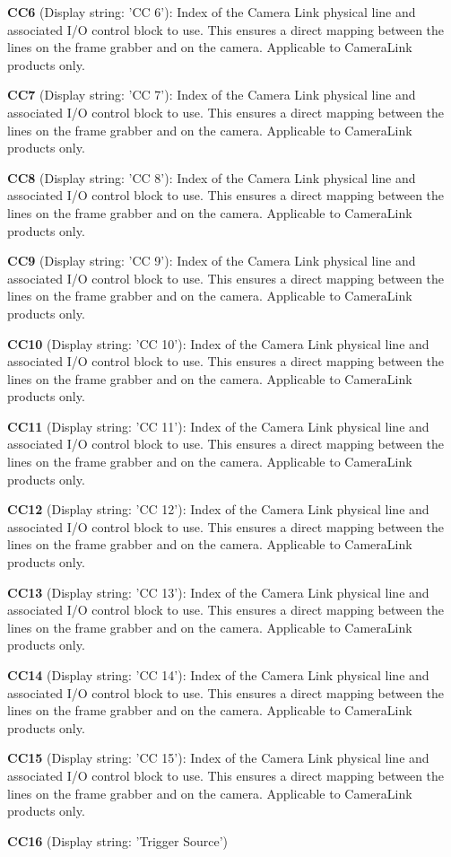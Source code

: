 \begin{DoxyItemize}
\item {\bfseries C\+C6} (Display string\+: 'C\+C 6')\+: Index of the Camera Link physical line and associated I/\+O control block to use. This ensures a direct mapping between the lines on the frame grabber and on the camera. Applicable to Camera\+Link products only.
\item {\bfseries C\+C7} (Display string\+: 'C\+C 7')\+: Index of the Camera Link physical line and associated I/\+O control block to use. This ensures a direct mapping between the lines on the frame grabber and on the camera. Applicable to Camera\+Link products only.
\item {\bfseries C\+C8} (Display string\+: 'C\+C 8')\+: Index of the Camera Link physical line and associated I/\+O control block to use. This ensures a direct mapping between the lines on the frame grabber and on the camera. Applicable to Camera\+Link products only.
\item {\bfseries C\+C9} (Display string\+: 'C\+C 9')\+: Index of the Camera Link physical line and associated I/\+O control block to use. This ensures a direct mapping between the lines on the frame grabber and on the camera. Applicable to Camera\+Link products only.
\item {\bfseries C\+C10} (Display string\+: 'C\+C 10')\+: Index of the Camera Link physical line and associated I/\+O control block to use. This ensures a direct mapping between the lines on the frame grabber and on the camera. Applicable to Camera\+Link products only.
\item {\bfseries C\+C11} (Display string\+: 'C\+C 11')\+: Index of the Camera Link physical line and associated I/\+O control block to use. This ensures a direct mapping between the lines on the frame grabber and on the camera. Applicable to Camera\+Link products only.
\item {\bfseries C\+C12} (Display string\+: 'C\+C 12')\+: Index of the Camera Link physical line and associated I/\+O control block to use. This ensures a direct mapping between the lines on the frame grabber and on the camera. Applicable to Camera\+Link products only.
\item {\bfseries C\+C13} (Display string\+: 'C\+C 13')\+: Index of the Camera Link physical line and associated I/\+O control block to use. This ensures a direct mapping between the lines on the frame grabber and on the camera. Applicable to Camera\+Link products only.
\item {\bfseries C\+C14} (Display string\+: 'C\+C 14')\+: Index of the Camera Link physical line and associated I/\+O control block to use. This ensures a direct mapping between the lines on the frame grabber and on the camera. Applicable to Camera\+Link products only.
\item {\bfseries C\+C15} (Display string\+: 'C\+C 15')\+: Index of the Camera Link physical line and associated I/\+O control block to use. This ensures a direct mapping between the lines on the frame grabber and on the camera. Applicable to Camera\+Link products only.
\item {\bfseries C\+C16} (Display string\+: 'Trigger Source')
\end{DoxyItemize}

